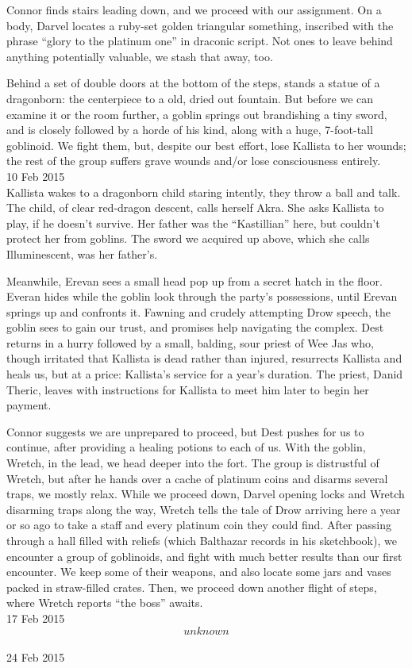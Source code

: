 \documentclass[letterpaper]{article}
\begin{document}
Connor finds stairs leading down, and we proceed with our assignment. On a body, Darvel locates a ruby-set golden triangular something, inscribed with the phrase ``glory to the platinum one'' in draconic script. Not ones to leave behind anything potentially valuable, we stash that away, too.

Behind a set of double doors at the bottom of the steps, stands a statue of a dragonborn: the centerpiece to a old, dried out fountain. But before we can examine it or the room further, a goblin springs out brandishing a tiny sword, and is closely followed by a horde of his kind, along with a huge, 7-foot-tall goblinoid. We fight them, but, despite our best effort, lose Kallista to her wounds; the rest of the group suffers grave wounds and/or lose consciousness entirely.\\

10 Feb 2015\\
Kallista wakes to a dragonborn child staring intently, they throw a ball and talk. The child, of clear red-dragon descent, calls herself Akra. She asks Kallista to play, if he doesn't survive. Her father was the ``Kastillian'' here, but couldn't protect her from goblins. The sword we acquired up above, which she calls Illuminescent, was her father's.

Meanwhile, Erevan sees a small head pop up from a secret hatch in the floor. Everan hides while the goblin look through the party's possessions, until Erevan springs up and confronts it. Fawning and crudely attempting Drow speech, the goblin sees to gain our trust, and promises help navigating the complex. Dest returns in a hurry followed by a small, balding, sour priest of Wee Jas who, though irritated that Kallista is dead rather than injured, resurrects Kallista and heals us, but at a price: Kallista's service for a year's duration. The priest, Danid Theric, leaves with instructions for Kallista to meet him later to begin her payment.

Connor suggests we are unprepared to proceed, but Dest pushes for us to continue, after providing a healing potions to each of us. With the goblin, Wretch, in the lead, we head deeper into the fort. The group is distrustful of Wretch, but after he hands over a cache of platinum coins and disarms several traps, we mostly relax. While we proceed down, Darvel opening locks and Wretch disarming traps along the way, Wretch tells the tale of Drow arriving here a year or so ago to take a staff and every platinum coin they could find. After passing through a hall filled with reliefs (which Balthazar records in his sketchbook), we encounter a group of goblinoids, and fight with much better results than our first encounter. We keep some of their weapons, and also locate some jars and vases packed in straw-filled crates. Then, we proceed down another flight of steps, where Wretch reports ``the boss'' awaits.\\

17 Feb 2015\\
\[unknown\]\\
24 Feb 2015
\end{document}
